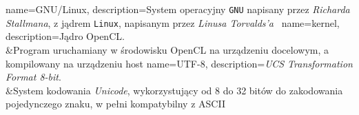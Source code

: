 %
%

{
	name={GNU/Linux},
	description={System operacyjny \texttt{GNU} napisany przez \emph{Richarda Stallmana}, z jądrem \texttt{Linux}, napisanym przez \emph{Linusa Torvalds'a}~\cite{gnulinux}}
}
{
	name={kernel},
	description={Jądro \gls{OpenCL}.\\&Program uruchamiany w środowisku OpenCL na urządzeniu docelowym, a kompilowany na urządzeniu host}
}
{
	name={UTF-8},
	description={\textit{UCS Transformation Format 8-bit}.\\&System kodowania \emph{Unicode}, wykorzystujący od 8 do 32 bitów do zakodowania pojedynczego znaku, w pełni kompatybilny z \gls{ASCII}}
}
